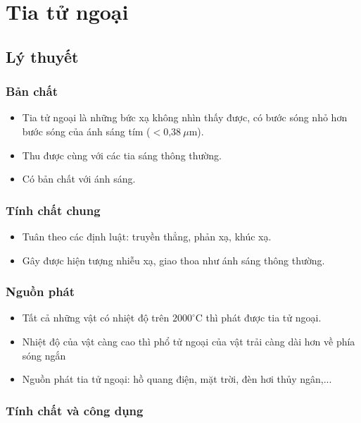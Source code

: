 
\chapter[Tia tử ngoại]{Tia tử ngoại}
\section{Lý thuyết}

\subsection {Bản chất}

\begin{itemize}
	\item Tia tử ngoại là những bức xạ không nhìn thấy được, có bước sóng nhỏ hơn bước sóng của ánh sáng tím ($< \text{0,38}\ \mu \text{m}$). 
	\item Thu được cùng với các tia sáng thông thường.
	\item Có bản chất với ánh sáng.
\end{itemize}

\subsection{Tính chất chung}
\begin{itemize}
	\item Tuân theo các định luật: truyền thẳng, phản xạ, khúc xạ.
	\item Gây được hiện tượng nhiễu xạ, giao thoa như ánh sáng thông thường. 
\end{itemize}

\subsection{Nguồn phát}

\begin{itemize}
	\item Tất cả những vật có nhiệt độ trên $2000^\circ \text{C}$ thì phát được tia tử ngoại.
	\item Nhiệt độ của vật càng cao thì phổ tử ngoại của vật trải càng dài hơn về phía sóng ngắn
	\item Nguồn phát tia tử ngoại: hồ quang điện, mặt trời, đèn hơi thủy ngân,...
\end{itemize}

\subsection{Tính chất và công dụng}

